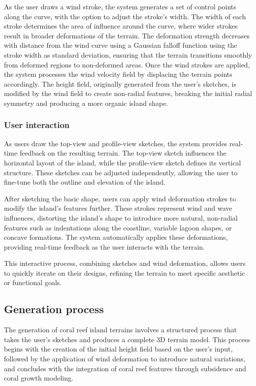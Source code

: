 As the user draws a wind stroke, the system generates a set of control points along the curve, with the option to adjust the stroke's width. The width of each stroke determines the area of influence around the curve, where wider strokes result in broader deformations of the terrain.
The deformation strength decreases with distance from the wind curve using a Gaussian falloff function using the stroke width as standard deviation, ensuring that the terrain transitions smoothly from deformed regions to non-deformed areas.
Once the wind strokes are applied, the system processes the wind velocity field by displacing the terrain points accordingly. The height field, originally generated from the user's sketches, is modified by the wind field to create non-radial features, breaking the initial radial symmetry and producing a more organic island shape.

\subsubsection{User interaction}

As users draw the top-view and profile-view sketches, the system provides real-time feedback on the resulting terrain. The top-view sketch influences the horizontal layout of the island, while the profile-view sketch defines its vertical structure. These sketches can be adjusted independently, allowing the user to fine-tune both the outline and elevation of the island.

After sketching the basic shape, users can apply wind deformation strokes to modify the island's features further. These strokes represent wind and wave influences, distorting the island's shape to introduce more natural, non-radial features such as indentations along the coastline, variable lagoon shapes, or concave formations. The system automatically applies these deformations, providing real-time feedback as the user interacts with the terrain.

This interactive process, combining sketches and wind deformation, allows users to quickly iterate on their designs, refining the terrain to meet specific aesthetic or functional goals.




\subsection{Generation process}
The generation of coral reef island terrains involves a structured process that takes the user's sketches and produces a complete 3D terrain model. This process begins with the creation of the initial height field based on the user's input, followed by the application of wind deformation to introduce natural variations, and concludes with the integration of coral reef features through subsidence and coral growth modeling.

